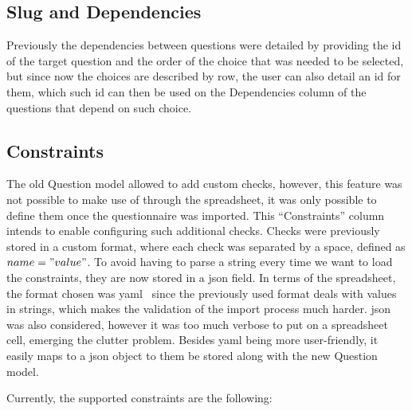 \subsection*{Slug and Dependencies}

Previously the dependencies between questions were detailed by providing the id of the target question and the order of the choice that was needed to be selected, but since now the choices are described by row, the user can also detail an id for them, which such id can then be used on the Dependencies column of the questions that depend on such choice.

\subsection*{Constraints}

The old Question model allowed to add custom checks, however, this feature was not possible to make use of through the spreadsheet, it was only possible to define them once the questionnaire was imported.
This ``Constraints'' column intends to enable configuring such additional checks.
Checks were previously stored in a custom format, where each check was separated by a space, defined as $name="value"$.
To avoid having to parse a string every time we want to load the constraints, they are now stored in a \gls{json} field.
In terms of the spreadsheet, the format chosen was \gls{yaml}~\cite{yaml} since the previously used format deals with values in strings, which makes the validation of the import process much harder.
\gls{json} was also considered, however it was too much verbose to put on a spreadsheet cell, emerging the clutter problem.
Besides \gls{yaml} being more user-friendly, it easily maps to a \gls{json} object to them be stored along with the new Question model.

Currently, the supported constraints are the following:

